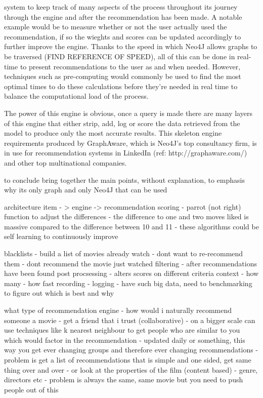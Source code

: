\documentclass[a4paper]{article}
\begin{document}
system to keep track of many aspects of the process throughout its journey through the engine and after the recommendation has been made. A notable example would be to measure whether or not the user actually used the recommendation, if so the wieghts and scores can be updated accordingly to further improve the engine. Thanks to the speed in which Neo4J allows graphs to be traversed (FIND REFERENCE OF SPEED), all of this can be done in real-time to present recommendations to the user as and when needed. However, techniques such as pre-computing would commonly be used to find the most optimal times to do these calculations before they're needed in real time to balance the computational load of the process.

The power of this engine is obvious, once a query is made there are many layers of this engine that either strip, add, log or score the data retrieved from the model to produce only the most accurate results. This skeleton engine requirements produced by GraphAware, which is Neo4J's top consultancy firm, is in use for recommendation systems in LinkedIn (ref: http://graphaware.com/) and other top multinational companies.


to conclude bring together the main points, without explanation, to emphasis why its only graph and only Neo4J that can be used



architecture
item - > engine -> recommendation 
scoring
    - parrot (not right) function to adjust the differences
    - the difference to one and two moves liked is massive compared to the difference between 10 and 11
    - these algorithms could be self learning to continuously improve

blacklists
    - build a list of movies already watch
        - dont want to re-recommend them
    - dont recommend the movie just watched
filtering
    - after recommendations have been found
post procsessing
    - alters scores on different criteria
context
    - how many
    - how fast
recording
    - logging
    - have such big data, need to benchmarking to figure out which is best and why







what type of recommendation engine
- how would i naturally recommend someone a movie
- get a friend that i trust (collaborative)
    - on a bigger scale can use techniques like k nearest neighbour to get people who are similar to you which would factor in the recommendation
        - updated daily or something, this way you get ever changing groups and therefore ever changing recommendations
    - problem is get a list of recommendations that is simple and one sided, get same thing over and over
- or look at the properties of the film (content based)
    - genre, directors etc
    - problem is always the same, same movie but you need to push people out of this
\end{document}
